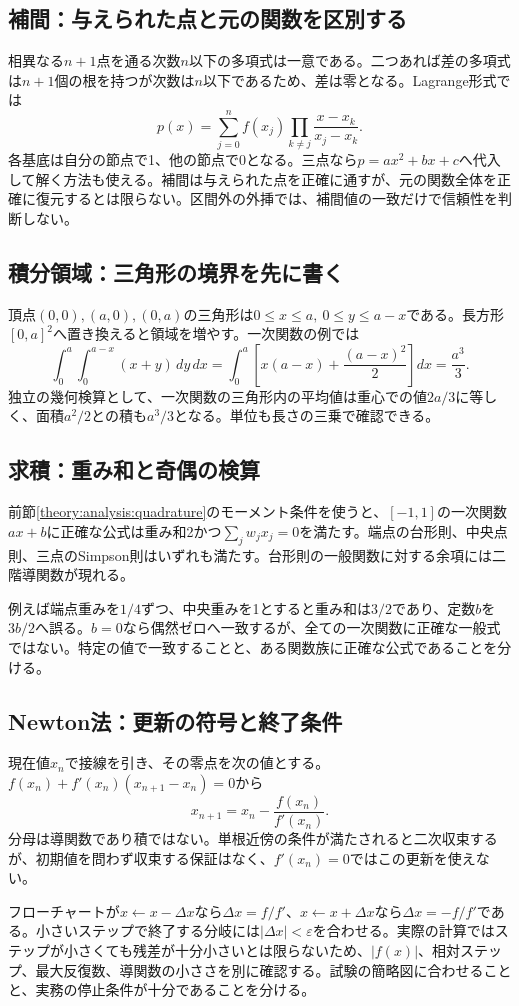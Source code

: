 \subsection{補間：与えられた点と元の関数を区別する}
\label{theory:numerics:interpolation}
相異なる$n+1$点を通る次数$n$以下の多項式は一意である。二つあれば差の多項式は$n+1$個の根を持つが次数は$n$以下であるため、差は零となる。Lagrange形式では
\[
 p(x)=\sum_{j=0}^{n}f(x_j)\prod_{k\ne j}\frac{x-x_k}{x_j-x_k}.
\]
各基底は自分の節点で1、他の節点で0となる\parencite{nist_interpolation}。三点なら$p=ax^2+bx+c$へ代入して解く方法も使える。補間は与えられた点を正確に通すが、元の関数全体を正確に復元するとは限らない。区間外の外挿では、補間値の一致だけで信頼性を判断しない。

\subsection{積分領域：三角形の境界を先に書く}
\label{theory:numerics:integration}
頂点$(0,0),(a,0),(0,a)$の三角形は$0\le x\le a,\ 0\le y\le a-x$である。長方形$[0,a]^2$へ置き換えると領域を増やす。一次関数の例では
\[
 \int_0^a\int_0^{a-x}(x+y)\,dy\,dx
 =\int_0^a\left[x(a-x)+\frac{(a-x)^2}{2}\right]dx
 =\frac{a^3}{3}.
\]
独立の幾何検算として、一次関数の三角形内の平均値は重心での値$2a/3$に等しく、面積$a^2/2$との積も$a^3/3$となる。単位も長さの三乗で確認できる。

\subsection{求積：重み和と奇偶の検算}
\label{theory:numerics:quadrature}
前節\ref{theory:analysis:quadrature}のモーメント条件を使うと、$[-1,1]$の一次関数$ax+b$に正確な公式は重み和2かつ$\sum_jw_jx_j=0$を満たす。端点の台形則、中央点則、三点のSimpson則はいずれも満たす。台形則の一般関数に対する余項には二階導関数が現れる\parencite{nist_quadrature}。

例えば端点重みを$1/4$ずつ、中央重みを1とすると重み和は$3/2$であり、定数$b$を$3b/2$へ誤る。$b=0$なら偶然ゼロへ一致するが、全ての一次関数に正確な一般式ではない。特定の値で一致することと、ある関数族に正確な公式であることを分ける。

\subsection{Newton法：更新の符号と終了条件}
\label{theory:numerics:newton}
現在値$x_n$で接線を引き、その零点を次の値とする。$f(x_n)+f'(x_n)(x_{n+1}-x_n)=0$から
\[
 x_{n+1}=x_n-\frac{f(x_n)}{f'(x_n)}.
\]
分母は導関数であり積ではない。単根近傍の条件が満たされると二次収束するが、初期値を問わず収束する保証はなく、$f'(x_n)=0$ではこの更新を使えない\parencite{nist_newton}。

フローチャートが$x\leftarrow x-\Delta x$なら$\Delta x=f/f'$、$x\leftarrow x+\Delta x$なら$\Delta x=-f/f'$である。小さいステップで終了する分岐には$|\Delta x|<\varepsilon$を合わせる。実際の計算ではステップが小さくても残差が十分小さいとは限らないため、$|f(x)|$、相対ステップ、最大反復数、導関数の小ささを別に確認する。試験の簡略図に合わせることと、実務の停止条件が十分であることを分ける。
